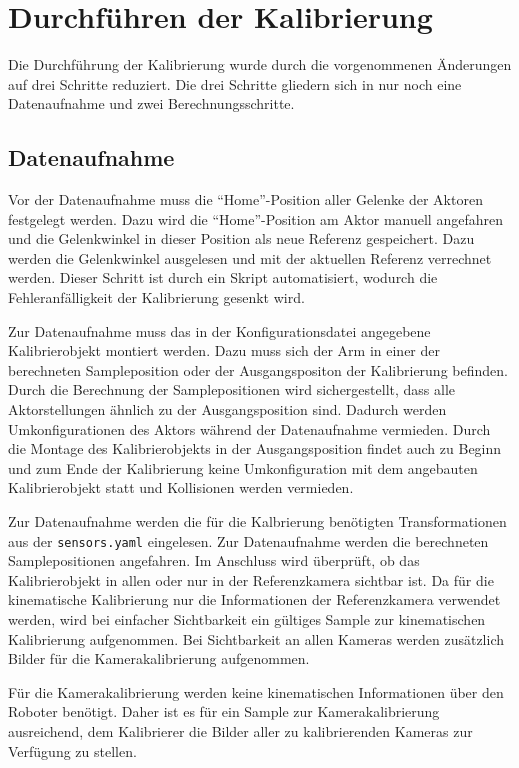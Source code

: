 \section{Durchführen der Kalibrierung}
\label{sec:Durchführen der Kalibrierung}

Die Durchführung der Kalibrierung wurde durch die vorgenommenen Änderungen auf
drei Schritte reduziert. Die drei Schritte gliedern sich in nur noch eine 
Datenaufnahme und zwei Berechnungsschritte.
\subsection{Datenaufnahme}
\label{sub:Datenaufnahme}

Vor der Datenaufnahme muss die ``Home''-Position aller Gelenke der Aktoren 
festgelegt werden. Dazu wird die ``Home''-Position am Aktor manuell angefahren 
und die Gelenkwinkel in dieser Position als neue Referenz gespeichert. Dazu 
werden die Gelenkwinkel ausgelesen und mit der aktuellen Referenz verrechnet 
werden. Dieser Schritt ist durch ein Skript automatisiert, wodurch die
Fehleranfälligkeit der Kalibrierung gesenkt wird.

Zur Datenaufnahme muss das in der Konfigurationsdatei angegebene Kalibrierobjekt
montiert werden. Dazu muss sich der Arm in einer der berechneten Sampleposition 
oder der Ausgangspositon der Kalibrierung befinden. Durch die Berechnung der 
Samplepositionen wird sichergestellt, dass alle Aktorstellungen ähnlich zu der
Ausgangsposition sind. Dadurch werden Umkonfigurationen des Aktors während der 
Datenaufnahme vermieden. Durch die Montage des Kalibrierobjekts in der
Ausgangsposition findet auch zu Beginn und zum Ende der Kalibrierung keine 
Umkonfiguration mit dem angebauten Kalibrierobjekt statt und Kollisionen werden
vermieden.

Zur Datenaufnahme werden die für die Kalbrierung benötigten Transformationen
aus der \texttt{sensors.yaml} eingelesen. Zur Datenaufnahme werden die 
berechneten Samplepositionen angefahren. Im Anschluss wird überprüft, ob das
Kalibrierobjekt in allen oder nur in der Referenzkamera sichtbar ist. Da für die
kinematische Kalibrierung nur die Informationen der Referenzkamera verwendet
werden, wird bei einfacher Sichtbarkeit ein gültiges Sample zur kinematischen 
Kalibrierung aufgenommen. Bei Sichtbarkeit an allen Kameras werden zusätzlich 
Bilder für die Kamerakalibrierung aufgenommen.

Für die Kamerakalibrierung werden keine kinematischen Informationen über den
Roboter benötigt. Daher ist es für ein Sample zur Kamerakalibrierung ausreichend,
dem Kalibrierer die Bilder aller zu kalibrierenden Kameras zur Verfügung zu
stellen. 


